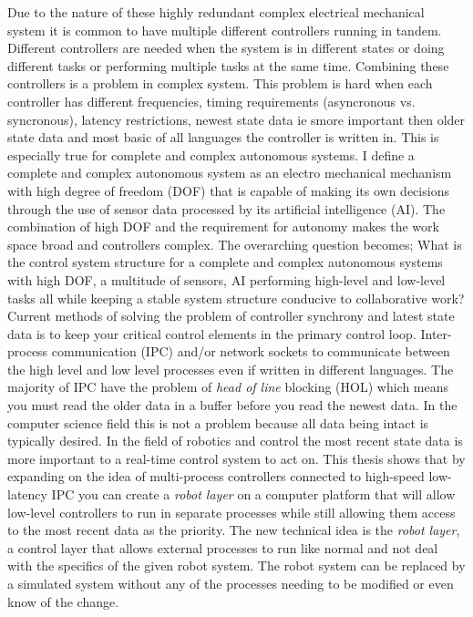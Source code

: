 Due to the nature of these highly redundant complex electrical mechanical system it is common to have multiple different controllers running in tandem.  
Different controllers are needed when the system is in different states or doing different tasks or performing multiple tasks at the same time.
Combining these controllers is a problem in complex system.
This problem is hard when each controller has different frequencies, timing requirements (asyncronous vs. syncronous), latency restrictions, newest state data ie smore important then older state data and most basic of all languages the controller is written in.
This is especially true for complete and complex autonomous systems.
I define a complete and complex autonomous system as an electro mechanical mechanism with high degree of freedom (DOF) that is capable of making its own decisions through the use of sensor data processed by its artificial intelligence (AI).
The combination of high DOF and the requirement for autonomy makes the work space broad and controllers complex.
The overarching question becomes; What is the control system structure for a complete and complex autonomous systems with high DOF, a multitude of sensors, AI performing high-level and low-level tasks all while keeping a stable system structure conducive to collaborative work?
Current methods of solving the problem of controller synchrony and latest state data is to keep your critical control elements in the primary control loop.
Inter-process communication (IPC) and/or network sockets to communicate between the high level and low level processes even if written in different languages.
The majority of IPC have the problem of \textit{head of line} blocking (HOL) which means you must read the older data in a buffer before you read the newest data.
In the computer science field this is not a problem because all data being intact is typically desired.  
In the field of robotics and control the most recent state data is more important to a real-time control system to act on.
This thesis shows that by expanding on the idea of multi-process controllers connected to high-speed low-latency IPC you can create a \textit{robot layer} on a computer platform that will allow low-level controllers to run in separate processes while still allowing them access to the most recent data as the priority.
The new technical idea is the \textit{robot layer}, a control layer that allows external processes to run like normal and not deal with the specifics of the given robot system.
The robot system can be replaced by a simulated system without any of the processes needing to be modified or even know of the change.
